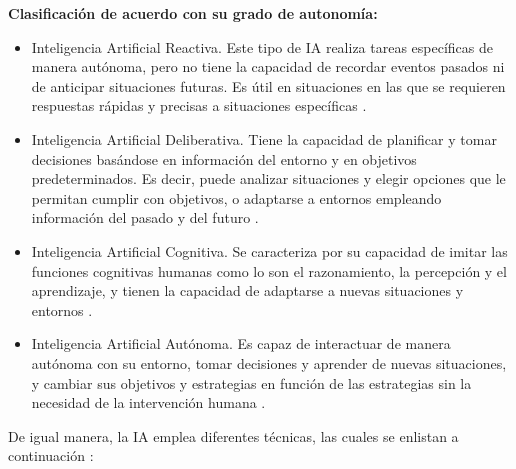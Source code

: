 \textbf{Clasificación de acuerdo con su grado de autonomía:}

\begin{itemize}
    \item Inteligencia Artificial Reactiva. Este tipo de IA realiza tareas específicas de manera autónoma, pero no tiene la capacidad de recordar eventos pasados ni de anticipar situaciones futuras. Es útil en situaciones en las que se requieren respuestas rápidas y precisas a situaciones específicas \cite{ref42}.\\
\item Inteligencia Artificial Deliberativa. Tiene la capacidad de planificar y tomar decisiones basándose en información del entorno y en objetivos predeterminados. Es decir, puede analizar situaciones y elegir opciones que le permitan cumplir con objetivos, o adaptarse a entornos empleando información del pasado y del futuro \cite{ref42}.\\

\item Inteligencia Artificial Cognitiva. Se caracteriza por su capacidad de imitar las funciones cognitivas humanas como lo son el razonamiento, la percepción y el aprendizaje, y tienen la capacidad de adaptarse a nuevas situaciones y entornos \cite{ref42}.\\

\item Inteligencia Artificial Autónoma. Es capaz de interactuar de manera autónoma con su entorno, tomar decisiones y aprender de nuevas situaciones, y cambiar sus objetivos y estrategias en función de las estrategias sin la necesidad de la intervención humana \cite{ref42}.

\end{itemize}

De igual manera, la IA emplea diferentes técnicas, las cuales se enlistan a continuación \cite{ref43}:

